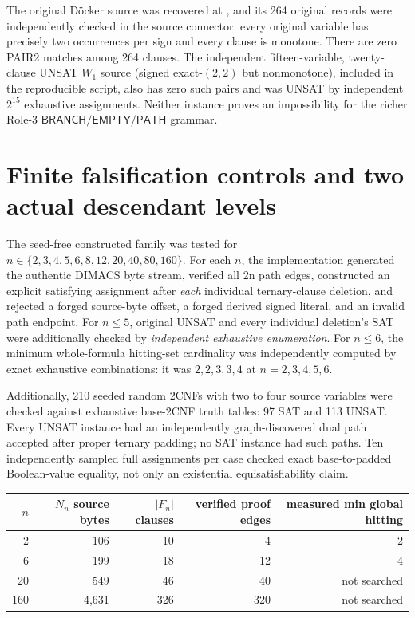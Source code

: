 \documentclass[11pt]{article}
\begin{document}
The original D\"ocker source was recovered at
, and its 264 original records were independently checked in the source connector: every original variable has precisely two occurrences per sign and every clause is monotone. There are zero PAIR2 matches among 264 clauses. The independent fifteen-variable, twenty-clause UNSAT $W_1$ source (signed exact-$(2,2)$ but nonmonotone), included in the reproducible script, also has zero such pairs and was UNSAT by independent $2^{15}$ exhaustive assignments. Neither instance proves an impossibility for the richer Role-3 $\mathsf{BRANCH}/\mathsf{EMPTY}/\mathsf{PATH}$ grammar.

\section{Finite falsification controls and two actual descendant levels}
The seed-free constructed family was tested for $n\in\{2,3,4,5,6,8,12,20,40,80,160\}$. For each $n$, the implementation generated the authentic DIMACS byte stream, verified all 2n path edges, constructed an explicit satisfying assignment after \emph{each} individual ternary-clause deletion, and rejected a forged source-byte offset, a forged derived signed literal, and an invalid path endpoint. For $n\le5$, original UNSAT and every individual deletion's SAT were additionally checked by \emph{independent exhaustive enumeration}. For $n\le6$, the minimum whole-formula hitting-set cardinality was independently computed by exact exhaustive combinations: it was $2,2,3,3,4$ at $n=2,3,4,5,6$.

Additionally, 210 seeded random $2$CNFs with two to four source variables were checked against exhaustive base-2CNF truth tables: 97 SAT and 113 UNSAT. Every UNSAT instance had an independently graph-discovered dual path accepted after proper ternary padding; no SAT instance had such paths. Ten independently sampled full assignments per case checked exact base-to-padded Boolean-value equality, not only an existential equisatisfiability claim.

\begin{center}\begin{tabular}{rrrrr}\toprule
$n$&$N_n$ source bytes&$|F_n|$ clauses&verified proof edges&measured min global hitting\\\midrule
2&106&10&4&2\\
6&199&18&12&4\\
20&549&46&40&not searched\\
160&4,631&326&320&not searched\\\bottomrule\end{tabular}\end{center}
\end{document}
